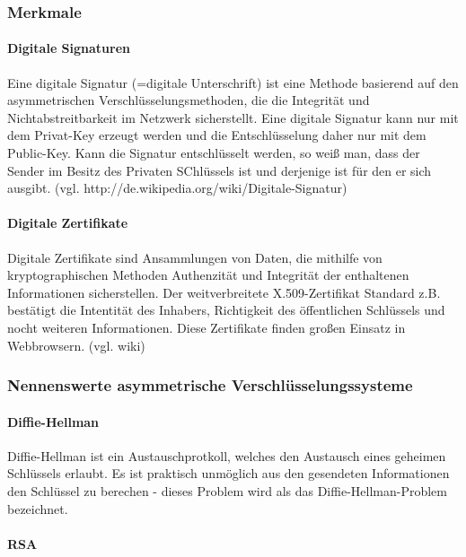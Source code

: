 \documentclass[11pt,a4paper]{report}
\begin{document}
\subsubsection{Merkmale}

\paragraph{Digitale Signaturen}

Eine digitale Signatur (=digitale Unterschrift) ist eine Methode basierend auf den asymmetrischen Verschlüsselungsmethoden, die die Integrität und Nichtabstreitbarkeit im Netzwerk sicherstellt. Eine digitale Signatur kann nur mit dem Privat-Key erzeugt werden und die Entschlüsselung daher nur mit dem Public-Key. Kann die Signatur entschlüsselt werden, so weiß man, dass der Sender im Besitz des Privaten SChlüssels ist und derjenige ist für den er sich ausgibt. (vgl. http://de.wikipedia.org/wiki/Digitale-Signatur)

\paragraph{Digitale Zertifikate}

Digitale Zertifikate sind Ansammlungen von Daten, die mithilfe von kryptographischen Methoden Authenzität und Integrität der enthaltenen Informationen sicherstellen. Der weitverbreitete X.509-Zertifikat Standard z.B. bestätigt die Intentität des Inhabers, Richtigkeit des öffentlichen Schlüssels und nocht weiteren Informationen. Diese Zertifikate finden großen Einsatz in Webbrowsern. (vgl. wiki)

\subsubsection{Nennenswerte asymmetrische Verschlüsselungssysteme}

\paragraph{Diffie-Hellman}

Diffie-Hellman ist ein Austauschprotkoll, welches den Austausch eines geheimen Schlüssels erlaubt. Es ist praktisch unmöglich aus den gesendeten Informationen den Schlüssel zu berechen - dieses Problem wird als das Diffie-Hellman-Problem bezeichnet.

\paragraph{RSA}
\end{document}
